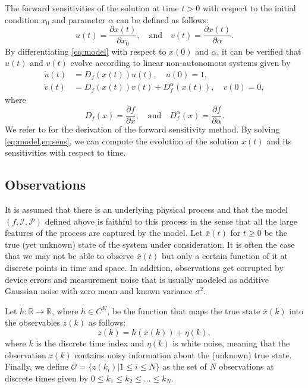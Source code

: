 \documentclass{article}
\begin{document}
The forward sensitivities of the solution at time $t>0$ with respect to the initial condition $x_0$ and parameter $\alpha$ can be defined as follows:
\begin{equation}
    u(t) = \dfrac{\partial x(t)}{\partial x_0}, \quad \text{and} \quad  v(t) = \dfrac{\partial x(t)}{\partial \alpha}.
\end{equation}
By differentiating \cref{eq:model} with respect to $x(0)$ and $\alpha$, it can be verified that $u(t)$ and $v(t)$ evolve according to linear non-autonomous systems given by
\begin{equation}
    \begin{aligned}
        \dot{u}(t) &= D_f(x(t)) u(t), \quad u(0) = 1,\\
        \dot{v}(t) &= D_f(x(t)) v(t) +  D_f^{\alpha}(x(t)), \quad v(0) = 0,
    \end{aligned} \label{eq:sens}
\end{equation}
where
\begin{equation}
    D_f(x) = \dfrac{\partial f}{\partial x}, \quad \text{and} \quad D_f^{\alpha}(x) = \dfrac{\partial f}{\partial \alpha}.
\end{equation}
We refer to \cite{lakshmivarahan2010forward,lakshmivarahan2017forecast} for the derivation of the forward sensitivity method. By solving \cref{eq:model,eq:sens}, we can compute the evolution of the solution $x(t)$ and its sensitivities with respect to time.

\subsection{Observations} \label{sec:obs}
It is assumed that there is an underlying physical process and that the model $(f, \mathcal{I}, \mathcal{P})$ defined above is faithful to this process in the sense that all the large features of the process are captured by the model. Let $\bar{x}(t)$ for $t \ge 0$ be the true (yet unknown) state of the system under consideration. \textcolor{rev}{It is often the case that we may not be able to observe $\bar{x}(t)$ but only a certain function of it at discrete points in time and space. In addition, observations get corrupted by device errors and measurement noise that is usually modeled as additive Gaussian noise with zero mean and known variance $\sigma^2$.}

Let $h:\mathbb{R} \to \mathbb{R}$, where $h\in C^K$, be the function that maps the true state $\bar{x}(k)$ into the observables $z(k)$ as follows:
\begin{equation}
    z(k) = h(\bar{x}(k)) + \eta(k), \label{eq:obs}
\end{equation}
where $k$ is the discrete time index and $\eta(k)$ is white noise, meaning that the observation $z(k)$ contains noisy information about the (unknown) true state. Finally, we define $\mathcal{O} = \{z(k_i) | 1 \le i \le N \}$ as the set of $N$ observations at discrete times given by $0 \le k_1 \le k_2 \le \dots \le k_N$.
\end{document}

